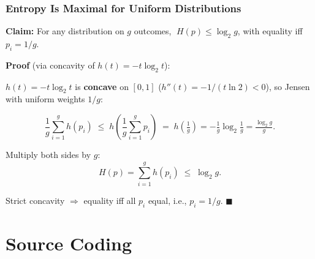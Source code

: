 \documentclass[aspectratio=169]{beamer}
\begin{document}
\begin{frame}
\frametitle{Entropy Is Maximal for Uniform Distributions}

\small
\textbf{Claim:} For any distribution on $g$ outcomes, $\;H(p) \leq \log_2 g$, with equality iff $p_i = 1/g$.

\vspace{0.1cm}
\textbf{Proof} (via concavity of $h(t) = -t\log_2 t$):
\;

\vspace{0.02cm}
$h(t) = -t\log_2 t$ is \textbf{concave} on $[0,1]$ ($h''(t) = -1/(t \ln 2) < 0$), so Jensen with uniform weights $1/g$:

\vspace{-0.15cm}
$$\frac{1}{g}\sum_{i=1}^g h(p_i) \;\leq\; h\!\left(\frac{1}{g}\sum_{i=1}^g p_i\right) \;=\; h\!\left(\tfrac{1}{g}\right) = -\tfrac{1}{g}\log_2\tfrac{1}{g} = \tfrac{\log_2 g}{g}.$$

\pause
Multiply both sides by $g$:
\vspace{-0.15cm}
$$H(p) = \sum_{i=1}^g h(p_i) \;\leq\; \log_2 g.$$

\vspace{-0.05cm}
Strict concavity $\Rightarrow$ equality iff all $p_i$ equal, i.e., $p_i = 1/g$. \;\;$\blacksquare$

\vspace{0.05cm}
\begin{center}
\end{center}
\end{frame}

\section{Source Coding}
\end{document}
